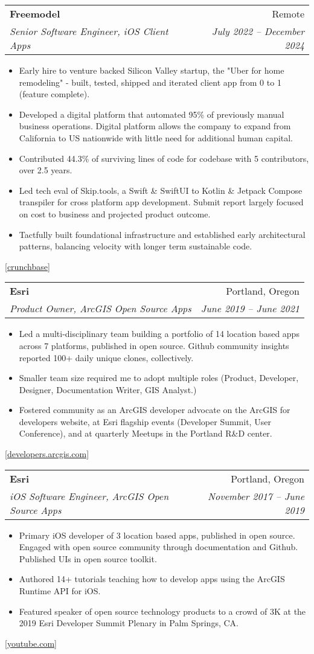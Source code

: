 \documentclass[letterpaper,11pt]{article}
\makeatletter
\newcommand{\resumeSubheading}[4]{
  \vspace{-1pt}\item
    \begin{tabular*}{0.97\textwidth}[t]{l@{\extracolsep{\fill}}r}
      \textbf{#1} & #2 \\
      \textit{\small #3} & \textit{\small #4} \\
    \end{tabular*}\vspace{-5pt}
}
\newcommand{\resumeItemListStart}{\begin{itemize}}
\newcommand{\resumeItemListEnd}{\end{itemize}\vspace{-5pt}}
\makeatother
\begin{document}
  \resumeSubheading
    {Freemodel}{Remote}
    {Senior Software Engineer, iOS Client Apps}{July 2022 -- December 2024}
    \resumeItemListStart
      \item Early hire to venture backed Silicon Valley startup, the "Uber for home remodeling" - built, tested, shipped and iterated client app from 0 to 1 (feature complete).
      \item Developed a digital platform that automated 95\% of previously manual business operations. Digital platform allows the company to expand from California to US nationwide with little need for additional human capital.
      \item Contributed 44.3\% of surviving lines of code for codebase with 5 contributors, over 2.5 years.
      \item Led tech eval of Skip.tools, a Swift \& SwiftUI to Kotlin \& Jetpack Compose transpiler for cross platform app development. Submit report largely focused on cost to business and projected product outcome.
      \item Tactfully built foundational infrastructure and established early architectural patterns, balancing velocity with longer term sustainable code.
    \resumeItemListEnd
  \href{https://www.crunchbase.com/organization/freemodel}{[crunchbase]}

  \resumeSubheading
    {Esri}{Portland, Oregon}
    {Product Owner, ArcGIS Open Source Apps}{June 2019 -- June 2021}
    \resumeItemListStart
      \item Led a multi-disciplinary team building a portfolio of 14 location based apps across 7 platforms, published in open source. Github community insights reported 100+ daily unique clones, collectively.
      \item Smaller team size required me to adopt multiple roles (Product, Developer, Designer, Documentation Writer, GIS Analyst.)
      \item Fostered community as an ArcGIS developer advocate on the ArcGIS for developers website, at Esri flagship events (Developer Summit, User Conference), and at quarterly Meetups in the Portland R\&D center.
    \resumeItemListEnd
    \href{https://developers.arcgis.com/}{[developers.arcgis.com]}

  \resumeSubheading
    {Esri}{Portland, Oregon}
    {iOS Software Engineer, ArcGIS Open Source Apps}{November 2017 -- June 2019}
    \resumeItemListStart
      \item Primary iOS developer of 3 location based apps, published in open source. Engaged with open source community through documentation and Github. Published UIs in open source toolkit.
      \item Authored 14+ tutorials teaching how to develop apps using the ArcGIS Runtime API for iOS.
      \item Featured speaker of open source technology products to a crowd of 3K at the 2019 Esri Developer Summit Plenary in Palm Springs, CA.
    \resumeItemListEnd
    \href{https://www.youtube.com/watch?v=yDxsPNwUo9U&t=5s}{[youtube.com]}
\end{document}
